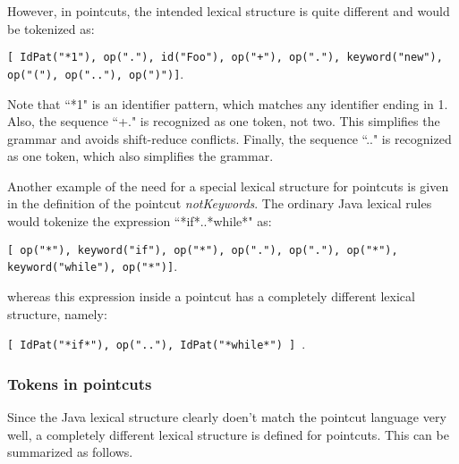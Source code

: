 \noindent
However, in
pointcuts, the intended lexical structure is quite different and
would be tokenized as:

{\tt[ IdPat("*1"), op("."), id("Foo"), op("+"), op("."),
keyword("new"), op("("), op(".."), op(")")]}.   

\noindent 
Note that ``*1" is
an identifier pattern, which matches any identifier ending in 1.  Also, the
sequence ``+." is recognized as one token, not two.  This simplifies
the grammar and avoids shift-reduce conflicts.  Finally, the sequence
``.." is recognized as one token, which also simplifies the grammar.

Another example of the need for a special lexical structure for pointcuts
is given in the definition of the pointcut {\em notKeywords}.   The ordinary
Java lexical rules would tokenize the expression ``*if*..*while*" as:

{\tt[ op("*"), keyword("if"), op("*"), op("."), op("."), op("*"), 
keyword("while"), op("*")]}.

\noindent
whereas this expression inside a pointcut has a completely different lexical
structure, namely:

{\tt[ IdPat("*if*"), op(".."), IdPat("*while*") ] }.
 
\subsubsection{Tokens in pointcuts}
Since the Java lexical structure clearly doen't match the pointcut
language very well,  a completely different lexical structure is
defined for pointcuts.   This can be summarized as follows.


